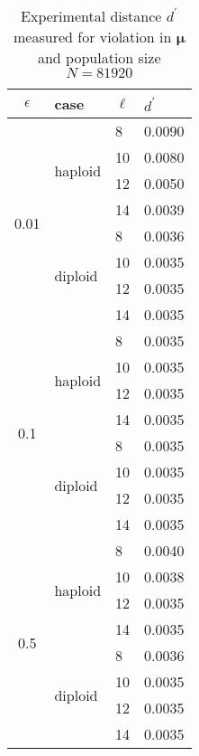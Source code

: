 \begin{table}[ht]
\caption{Experimental distance $d^\prime$ measured for violation in $\bm{\mu}$ and population size $N = 81920$ }
\centering
\begin{tabularx}{0.75\textwidth}{ c *{3}{X}}
\toprule
$\epsilon$ & case & $\ell$ & $d^\prime$ \\
\midrule
\multirow{8}{*}{0.01} & \multirow{4}{*}{haploid} 	& 8 & 0.0090 \\
		      &   				& 10 & 0.0080 \\ 
		      & 			 	& 12 & 0.0050 \\
		      &  	 			& 14 & 0.0039 \\ 
		      \cmidrule(l){2-4}
		      & \multirow{4}{*}{diploid} 	& 8 & 0.0036 \\
		      &  	 			& 10 & 0.0035 \\
		      & 			 	& 12 & 0.0035 \\
		      &  	 			& 14 & 0.0035 \\
		      \midrule
\multirow{8}{*}{0.1} & \multirow{4}{*}{haploid} 	& 8 & 0.0035 \\
		      &   				& 10 & 0.0035 \\	
		      & 				& 12 & 0.0035 \\	
		      &  	 			& 14 & 0.0035 \\
		      \cmidrule(l){2-4}
		      & \multirow{4}{*}{diploid} 	& 8 & 0.0035 \\
		      &  	 			& 10 & 0.0035 \\
		      & 				& 12 & 0.0035 \\
		      &  	 			& 14 & 0.0035 \\
		      \midrule
\multirow{8}{*}{0.5} & \multirow{4}{*}{haploid} 	& 8 & 0.0040 \\
		      &   				& 10 & 0.0038 \\
		      & 				& 12 & 0.0035 \\
		      &  	 			& 14 & 0.0035 \\
		      \cmidrule(l){2-4}
		      & \multirow{4}{*}{diploid} 	& 8 & 0.0036 \\	
		      &  	 			& 10 & 0.0035 \\
		      &  				& 12 & 0.0035 \\
		      &  	 			& 14 & 0.0035 \\
\bottomrule
\end{tabularx}
\label{ditanceMu81920}
\end{table}  
